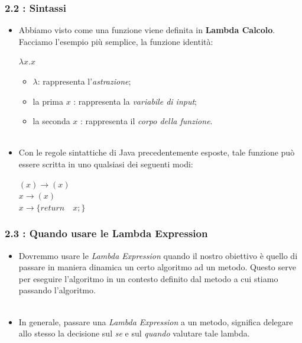 \documentclass{beamer}
\begin{document}
\begin{frame}
	\frametitle{\textbf{2.2 : Sintassi}}
	\begin{itemize}
		\item
			Abbiamo visto come una funzione viene definita in \textbf{Lambda Calcolo}. Facciamo l'esempio più semplice, la funzione identità:
			\begin{center}
				\Large$\lambda x.x$
			\end{center}
			\begin{itemize}
				\item
					\Large$\lambda$: rappresenta l'\textit{astrazione};
				\item
					la prima \Large $x$ : rappresenta la \textit{variabile di input};
				\item
					la seconda \Large $x$ : rappresenta il  \textit{corpo della funzione}.\\\
			\end{itemize}	
		\item
			Con le regole sintattiche di Java precedentemente esposte, tale funzione pu\`o essere scritta in uno qualsiasi dei seguenti modi:
			\begin{center}
				\Large$(x)\rightarrow(x)$\\
				\Large$x\rightarrow(x)$\\
				\Large$x\rightarrow\{return \quad x;\}$		
			\end{center}						
	\end{itemize}
\end{frame}


\begin{frame}
	\frametitle{\textbf{2.3 : Quando usare le Lambda Expression}}
	\begin{itemize}
		\item
			Dovremmo usare le \textit{Lambda Expression} quando il nostro obiettivo è quello di passare in maniera dinamica un certo algoritmo ad un metodo. Questo serve per eseguire l'algoritmo in un contesto definito dal metodo a cui stiamo passando l'algoritmo. \\\
		\item
			In generale, passare una \textit{Lambda Expression} a un metodo, significa delegare allo stesso la decisione sul \emph{se} e sul \emph{quando} valutare tale lambda.
	\end{itemize}
\end{frame}
\end{document}

